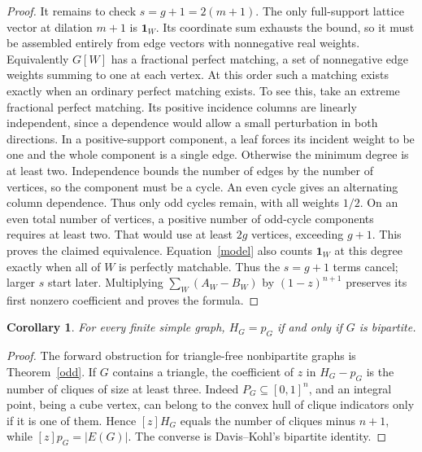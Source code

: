\documentclass[11pt]{article}
\newtheorem{corollary}[theorem]{Corollary}
\newcommand{\one}{\mathbf1}
\begin{document}
\begin{proof}
It remains to check $s=g+1=2(m+1)$. The only full-support lattice vector at dilation $m+1$ is $\one_W$. Its coordinate sum exhausts the bound, so it must be assembled entirely from edge vectors with nonnegative real weights. Equivalently $G[W]$ has a fractional perfect matching, a set of nonnegative edge weights summing to one at each vertex. At this order such a matching exists exactly when an ordinary perfect matching exists. To see this, take an extreme fractional perfect matching. Its positive incidence columns are linearly independent, since a dependence would allow a small perturbation in both directions. In a positive-support component, a leaf forces its incident weight to be one and the whole component is a single edge. Otherwise the minimum degree is at least two. Independence bounds the number of edges by the number of vertices, so the component must be a cycle. An even cycle gives an alternating column dependence. Thus only odd cycles remain, with all weights $1/2$. On an even total number of vertices, a positive number of odd-cycle components requires at least two. That would use at least $2g$ vertices, exceeding $g+1$. This proves the claimed equivalence. Equation~\eqref{model} also counts $\one_W$ at this degree exactly when all of $W$ is perfectly matchable. Thus the $s=g+1$ terms cancel; larger $s$ start later. Multiplying $\sum_W(A_W-B_W)$ by $(1-z)^{n+1}$ preserves its first nonzero coefficient and proves the formula.
\end{proof}
\begin{corollary}\label{iff}
For every finite simple graph, $H_G=p_G$ if and only if $G$ is bipartite.
\end{corollary}
\begin{proof}
The forward obstruction for triangle-free nonbipartite graphs is Theorem~\ref{odd}. If $G$ contains a triangle, the coefficient of $z$ in $H_G-p_G$ is the number of cliques of size at least three. Indeed $P_G\subseteq[0,1]^n$, and an integral point, being a cube vertex, can belong to the convex hull of clique indicators only if it is one of them. Hence $[z]H_G$ equals the number of cliques minus $n+1$, while $[z]p_G=|E(G)|$. The converse is Davis--Kohl's bipartite identity.
\end{proof}
\end{document}
